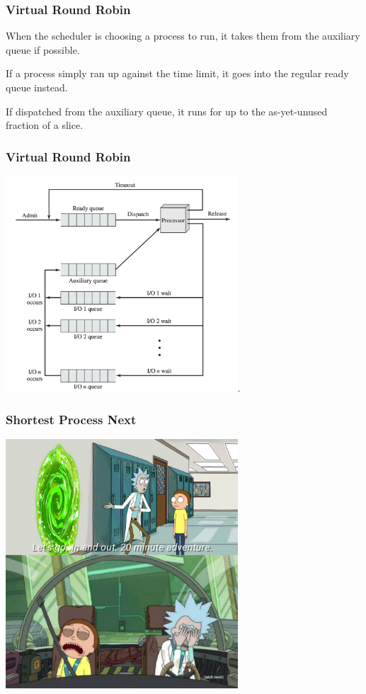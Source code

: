 \begin{frame}
\frametitle{Virtual Round Robin}

When the scheduler is choosing a process to run, it takes them from the auxiliary queue if possible. 

If a process simply ran up against the time limit, it goes into the regular ready queue instead. 

If dispatched from the auxiliary queue, it runs for up to the as-yet-unused fraction of a slice.

\end{frame}

\begin{frame}
\frametitle{Virtual Round Robin}

\begin{center}
	\includegraphics[width=0.65\textwidth]{images/virtual-round-robin.png}.
\end{center}


\end{frame}


\begin{frame}
\frametitle{Shortest Process Next}

\begin{center}
	\includegraphics[width=0.65\textwidth]{images/quick-adventure.png}
\end{center}


\end{frame}



